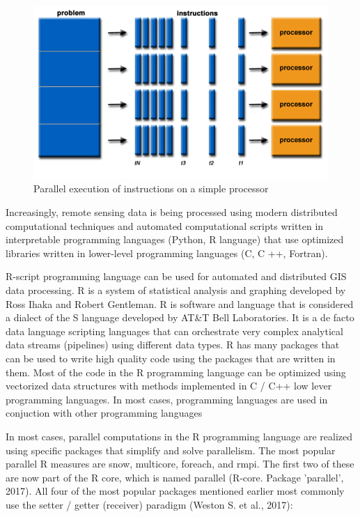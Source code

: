 {{{	\begin{figure}[H]
		\centering
		\includegraphics[width=0.9\linewidth]{images/par_exec.png}
		\caption{Parallel execution of instructions on a simple processor}
		\label{fig:par_exec}
	\end{figure}

	Increasingly, remote sensing data is being processed using modern distributed computational techniques and automated computational scripts written in interpretable programming languages (Python, R language) that use optimized libraries written in lower-level programming languages (C, C ++, Fortran).
	
	R-script programming language can be used for automated and distributed GIS data processing. R is a system of statistical analysis and graphing developed by Ross Ihaka and Robert Gentleman. R is software and language that is considered a dialect of the S language developed by AT\&T Bell Laboratories. It is a de facto data language scripting languages that can orchestrate very complex analytical data streams (pipelines) using different data types. R has many packages that can be used to write high quality code using the packages that are written in them. Most of the code in the R programming language can be optimized using vectorized data structures with methods implemented in C / C++ low lever programming languages. In most cases, programming languages are used in conjuction with other programming languages
 	
 	In most cases, parallel computations in the R programming language are realized using specific packages that simplify and solve parallelism. The most popular parallel R measures are snow, multicore, foreach, and rmpi. The first two of these are now part of the R core, which is named parallel (R-core. Package 'parallel', 2017). All four of the most popular packages mentioned earlier most commonly use the setter / getter (receiver) paradigm (Weston S. et al., 2017):
	
}}}
